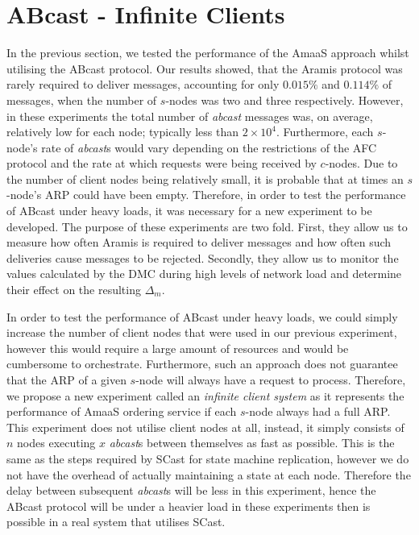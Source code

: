 \section{ABcast - Infinite Clients}\label{sec:infinite_clients_eval}
    In the previous section, we tested the performance of the \textsf{AmaaS} approach whilst utilising the \textsf{ABcast} protocol.  Our results showed, that the \textsf{Aramis} protocol was rarely required to deliver messages, accounting for only $0.015\%$ and $0.114\%$ of messages, when the number of $s$-nodes was two and three respectively.  However, in these experiments the total number of \emph{abcast} messages was, on average, relatively low for each node; typically less than $2 \times 10^4$.  Furthermore, each $s$-node's rate of \emph{abcast}s would vary depending on the restrictions of the AFC protocol and the rate at which requests were being received by $c$-nodes.  Due to the number of client nodes being relatively small, it is probable that at times an $s$-node's ARP could have been empty.  Therefore, in order to test the performance of \textsf{ABcast} under heavy loads, it was necessary for a new experiment to be developed.  The purpose of these experiments are two fold.  First, they allow us to measure how often \textsf{Aramis} is required to deliver messages and how often such deliveries cause messages to be rejected.  Secondly, they allow us to monitor the values calculated by the DMC during high levels of network load and determine their effect on the resulting $\Delta_m$.  
    
    In order to test the performance of \textsf{ABcast} under heavy loads, we could simply increase the number of client nodes that were used in our previous experiment, however this would require a large amount of resources and would be cumbersome to orchestrate.  Furthermore, such an approach does not guarantee that the ARP of a given $s$-node will always have a request to process.  Therefore, we propose a new experiment called an \emph{infinite client system} as it represents the performance of \textsf{AmaaS} ordering service if each $s$-node always had a full ARP.  This experiment does not utilise client nodes at all, instead, it simply consists of $n$ nodes executing $x$ \emph{abcast}s between themselves as fast as possible.  This is the same as the steps required by \textsf{SCast} for state machine replication, however we do not have the overhead of actually maintaining a state at each node.  Therefore the delay between subsequent \emph{abcast}s will be less in this experiment, hence the \textsf{ABcast} protocol will be under a heavier load in these experiments then is possible in a real system that utilises \textsf{SCast}. 
    
